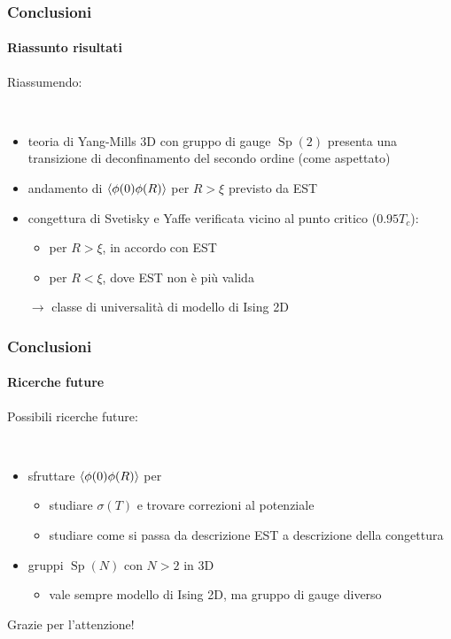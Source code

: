 \documentclass{beamer}
\newcommand{\Sp}{\operatorname{Sp}}
\begin{document}
\begin{frame}
	\frametitle{Conclusioni}
	\framesubtitle{Riassunto risultati}

	Riassumendo:

	\

	\begin{itemize}
		\item teoria di Yang-Mills 3D con gruppo di gauge $\Sp(2)$ presenta una transizione di deconfinamento del
		secondo ordine (come aspettato)
		\item andamento di $\expval{\phi(0)\phi(R)}$ per $R > \xi$ previsto da EST
		\item congettura di Svetisky e Yaffe verificata vicino al punto critico ($0.95T_c$):
			\begin{itemize}
				\item per $R > \xi$, in accordo con EST
				\item per $R < \xi$, dove EST non è più valida
			\end{itemize} 
			$\rightarrow$ classe di universalità di modello di Ising 2D
	\end{itemize}

\end{frame}

\begin{frame}
	\frametitle{Conclusioni}
	\framesubtitle{Ricerche future}
	
	Possibili ricerche future:

	\

	\begin{itemize}
		\item sfruttare $\expval{\phi(0)\phi(R)}$ per  
			\begin{itemize}
				\item studiare $\sigma(T)$ e trovare correzioni al potenziale
				\item studiare come si passa da descrizione EST a descrizione della congettura
			\end{itemize}
		\item gruppi $\Sp(N)$ con $N > 2$ in 3D
			\begin{itemize}
				\item vale sempre modello di Ising 2D, ma gruppo di gauge diverso
			\end{itemize}
	\end{itemize}

\end{frame}

\begin{frame}

	\centering
	\Huge
	Grazie per l'attenzione!	

\end{frame}
\end{document}
